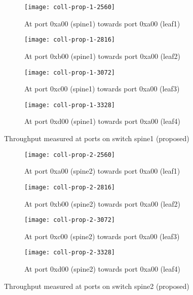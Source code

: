 \begin{figure}[htbp]
    \centering
    \begin{subfigure}{.24\linewidth}
        \texttt{[image: coll-prop-1-2560]}
        \caption{At port 0xa00 (spine1) \newline towards port 0xa00 (leaf1)}%
        \label{fig:spine1-leaf1-prop}
    \end{subfigure}
    \begin{subfigure}{.24\linewidth}
        \texttt{[image: coll-prop-1-2816]}
        \caption{At port 0xb00 (spine1) \newline towards port 0xa00 (leaf2)}%
        \label{fig:spine1-leaf2-prop}
    \end{subfigure}
    \begin{subfigure}{.24\linewidth}
        \texttt{[image: coll-prop-1-3072]}
        \caption{At port 0xc00 (spine1) \newline towards port 0xa00 (leaf3)}%
        \label{fig:spine1-leaf3-prop}
    \end{subfigure}
    \begin{subfigure}{.24\linewidth}
        \texttt{[image: coll-prop-1-3328]}
        \caption{At port 0xd00 (spine1) \newline towards port 0xa00 (leaf4)}%
        \label{fig:spine1-leaf4-prop}
    \end{subfigure}
    \caption{Throughput measured at ports on switch spine1 (proposed)}
    \label{fig:coll-spine1-prop}
    \begin{subfigure}{.24\linewidth}
        \texttt{[image: coll-prop-2-2560]}
        \caption{At port 0xa00 (spine2) \newline towards port 0xa00 (leaf1)}%
        \label{fig:spine2-leaf1-prop}
    \end{subfigure}
    \begin{subfigure}{.24\linewidth}
        \texttt{[image: coll-prop-2-2816]}
        \caption{At port 0xb00 (spine2) \newline towards port 0xa00 (leaf2)}%
        \label{fig:spine2-leaf2-prop}
    \end{subfigure}
    \begin{subfigure}{.24\linewidth}
        \texttt{[image: coll-prop-2-3072]}
        \caption{At port 0xc00 (spine2) \newline towards port 0xa00 (leaf3)}%
        \label{fig:spine2-leaf3-prop}
    \end{subfigure}
    \begin{subfigure}{.24\linewidth}
        \texttt{[image: coll-prop-2-3328]}
        \caption{At port 0xd00 (spine2) \newline towards port 0xa00 (leaf4)}%
        \label{fig:spine2-leaf4-prop}
    \end{subfigure}
    \caption{Throughput measured at ports on switch spine2 (proposed)}
    \label{fig:coll-spine2-prop}
\end{figure}


